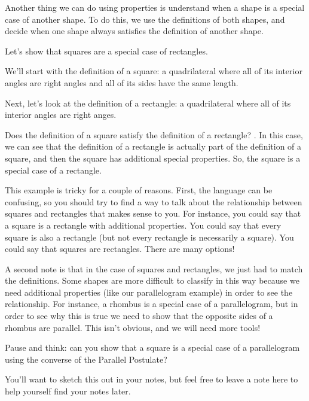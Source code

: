 \documentclass{ximera}
\begin{document}
Another thing we can do using properties is understand when a shape is a special case of another shape. To do this, we use the definitions of both shapes, and decide when one shape always satisfies the definition of another shape.

\begin{example}
	Let's show that squares are a special case of rectangles.
	
	We'll start with the definition of a square: a quadrilateral where all of its interior angles are right angles and all of its sides have the same length.
	
	Next, let's look at the definition of a rectangle: a quadrilateral where all of its interior angles are right anges.
	
	Does the definition of a square satisfy the definition of a rectangle? . In this case, we can see that the definition of a rectangle is actually part of the definition of a square, and then the square has additional special properties. So, the square is a special case of a rectangle.
\end{example}

This example is tricky for a couple of reasons. First, the language can be confusing, so you should try to find a way to talk about the relationship between squares and rectangles that makes sense to you. For instance, you could say that a square is a rectangle with additional properties. You could say that every square is also a rectangle (but not every rectangle is necessarily a square). You could say that squares are rectangles. There are many options!

A second note is that in the case of squares and rectangles, we just had to match the definitions. Some shapes are more difficult to classify in this way because we need additional properties (like our parallelogram example) in order to see the relationship. For instance, a rhombus is a special case of a parallelogram, but in order to see why this is true we need to show that the opposite sides of a rhombus are parallel. This isn't obvious, and we will need more tools!

\begin{question}
Pause and think: can you show that a square is a special case of a parallelogram using the converse of the Parallel Postulate?
\begin{freeResponse}
You'll want to sketch this out in your notes, but feel free to leave a note here to help yourself find your notes later.
\end{freeResponse}
\end{question}
\end{document}
